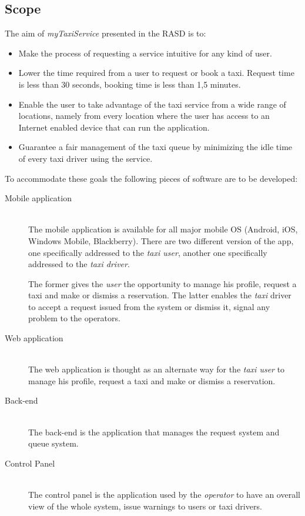 \documentclass[12pt, a4paper]{article}
\begin{document}
\newpage

\subsection{Scope}

The aim of \emph{myTaxiService} presented in the RASD is to:
\begin{itemize}
\item Make the process of requesting a service intuitive for any kind of user.
\item Lower the time required from a user to request or book a taxi. Request time is less than 30 seconds, booking time is less than 1,5 minutes.
\item Enable the user to take advantage of the taxi service from a wide range of locations, namely from every location where the user has access to an Internet enabled device that can run the application.
\item Guarantee a fair management of the taxi queue by minimizing the idle time of every taxi driver using the service.
\end{itemize}
To accommodate these goals the following pieces of software are to be developed:

\begin{description}
  \item[Mobile application] \hfill \\
  The mobile application is available for all major mobile OS (Android, iOS, Windows Mobile, Blackberry).
  There are two different version of the app, one specifically addressed to the \emph{taxi user}, another one specifically addressed to the \emph{taxi driver}.

  The former gives the \emph{user} the opportunity to manage his profile, request a taxi and make or dismiss a reservation.
  The latter enables the \emph{taxi} driver to accept a request issued from the system or dismiss it, signal any problem to the operators.

  \item[Web application] \hfill \\
  The web application is thought as an alternate way for the \emph{taxi user} to manage his profile, request a taxi and make or dismiss a reservation.

  \item[Back-end] \hfill \\
  The back-end is the application that manages the request system and queue system. 

  \item[Control Panel] \hfill \\
  The control panel is the application used by the \emph{operator} to have an overall view of the whole system, issue warnings to users or taxi drivers.
\end{description}
\end{document}
